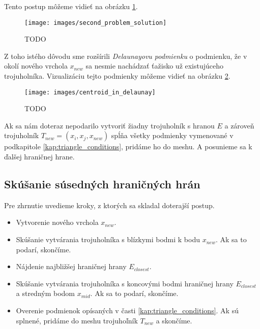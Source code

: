 \begin{enumerate}
{    Tento postup môžeme vidieť na obrázku \ref{obr:second_problem_solution}.

    \begin{figure}
        \centerline{\texttt{[image: images/second\_problem\_solution]}}
        \caption[TODO]{TODO}
        \label{obr:second_problem_solution}
    \end{figure}

    Z toho istého dôvodu sme rozšírili \textit{Delaunayovu podmienku} o podmienku, že 
    v okolí nového vrchola $x_{new}$ sa nesmie nachádzať ťažisko už existujúceho trojuholníka.
    Vizualizáciu tejto podmienky môžeme vidieť na obrázku \ref{obr:centroid_in_delaunay}.

    \begin{figure}
        \centerline{\texttt{[image: images/centroid\_in\_delaunay]}}
        \caption[TODO]{TODO}
        \label{obr:centroid_in_delaunay}
    \end{figure}
}
\end{enumerate}

Ak sa nám doteraz nepodarilo vytvoriť žiadny trojuholník s hranou $E$ a zároveň trojuholník 
$T_{new} = (x_i, x_j, x_{new})$ spĺňa všetky podmienky vymenované v podkapitole 
\ref{kap:triangle_conditions}, pridáme ho do meshu. A posunieme sa k ďalšej hraničnej hrane.

\subsection{Skúšanie súsedných hraničných hrán}
Pre zhrnutie uvedieme kroky, z ktorých sa skladal doterajší postup.
\begin{itemize}
\item{
    Vytvorenie nového vrchola $x_{new}$.
}
\item{
    Skúšanie vytvárania trojuholníka s blízkymi bodmi k bodu $x_{new}$.
    Ak sa to podarí, skončíme. 
}
\item{
    Nájdenie najbližšej hraničnej hrany $E_{closest}$.
}
\item{
    Skúšanie vytvárania trojuholníka s koncovými bodmi hraničnej hrany $E_{closest}$ a 
    stredným bodom $x_{mid}$. Ak sa to podarí, skončíme.
}
\item{
    Overenie podmienok opísaných v časti \ref{kap:triangle_conditions}. Ak sú splnené, pridáme do 
    meshu trojuhoľník $T_{new}$ a skončíme.
}
\end{itemize}

